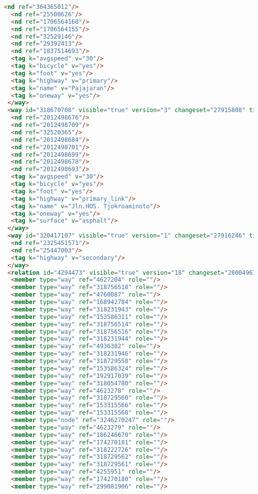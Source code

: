 \begin{lstlisting}[language=HTML,basicstyle=\tiny,caption=test.xml]
  <nd ref="364365012"/>
  <nd ref="25500626"/>
  <nd ref="1706564168"/>
  <nd ref="1706564155"/>
  <nd ref="32529146"/>
  <nd ref="29392413"/>
  <nd ref="1837514693"/>
  <tag k="avgspeed" v="30"/>
  <tag k="bicycle" v="yes"/>
  <tag k="foot" v="yes"/>
  <tag k="highway" v="primary"/>
  <tag k="name" v="Pajajaran"/>
  <tag k="oneway" v="yes"/>
 </way>
 <way id="318670708" visible="true" version="3" changeset="27915808" timestamp="2015-01-04T17:54:58Z" user="isonpurba" uid="2552445">
  <nd ref="2012498676"/>
  <nd ref="2012498709"/>
  <nd ref="32520365"/>
  <nd ref="2012498684"/>
  <nd ref="2012498701"/>
  <nd ref="2012498699"/>
  <nd ref="2012498678"/>
  <nd ref="2012498693"/>
  <tag k="avgspeed" v="30"/>
  <tag k="bicycle" v="yes"/>
  <tag k="foot" v="yes"/>
  <tag k="highway" v="primary_link"/>
  <tag k="name" v="Jln.HOS. Tjokroaminoto"/>
  <tag k="oneway" v="yes"/>
  <tag k="surface" v="asphalt"/>
 </way>
 <way id="320417107" visible="true" version="1" changeset="27916246" timestamp="2015-01-04T18:10:18Z" user="isonpurba" uid="2552445">
  <nd ref="2325451571"/>
  <nd ref="25447003"/>
  <tag k="highway" v="secondary"/>
 </way>
 <relation id="4294473" visible="true" version="18" changeset="28004961" timestamp="2015-01-08T20:02:57Z" user="isonpurba" uid="2552445">
  <member type="way" ref="4627204" role=""/>
  <member type="way" ref="318756518" role=""/>
  <member type="way" ref="4760087" role=""/>
  <member type="way" ref="168942784" role=""/>
  <member type="way" ref="318231943" role=""/>
  <member type="way" ref="153586311" role=""/>
  <member type="way" ref="318756514" role=""/>
  <member type="way" ref="318756516" role=""/>
  <member type="way" ref="318231944" role=""/>
  <member type="way" ref="4936382" role=""/>
  <member type="way" ref="318231946" role=""/>
  <member type="way" ref="318729558" role=""/>
  <member type="way" ref="153586324" role=""/>
  <member type="way" ref="192917039" role=""/>
  <member type="way" ref="318054780" role=""/>
  <member type="way" ref="4623278" role=""/>
  <member type="way" ref="318729560" role=""/>
  <member type="way" ref="153315566" role=""/>
  <member type="way" ref="153315568" role=""/>
  <member type="node" ref="3246270247" role=""/>
  <member type="way" ref="4623279" role=""/>
  <member type="way" ref="186246670" role=""/>
  <member type="way" ref="174270181" role=""/>
  <member type="way" ref="318222726" role=""/>
  <member type="way" ref="318729562" role=""/>
  <member type="way" ref="318729561" role=""/>
  <member type="way" ref="4255951" role=""/>
  <member type="way" ref="174270180" role=""/>
  <member type="way" ref="299081906" role=""/>

\end{lstlisting}
